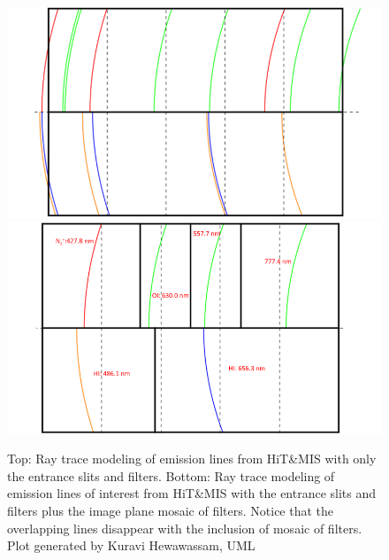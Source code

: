 \documentclass[crop=false,class=mitthesis,oneside,font=12pt]{standalone}
\begin{document}
\begin{figure}[H]
	\centering\includegraphics[width=30pc]{hit_i.png}
    \centering\includegraphics[width=30pc]{hit_f.png}
	\caption{Top: Ray trace modeling of emission lines from HiT\&MIS with only the entrance slits and filters. Bottom: Ray trace modeling of emission lines of interest from HiT\&MIS with the entrance slits and filters plus the image plane mosaic of filters. Notice that the overlapping lines disappear with the inclusion of mosaic of filters. Plot generated by Kuravi Hewawassam, UML}
	\label{fig:hit_if}
\end{figure}
\end{document}

